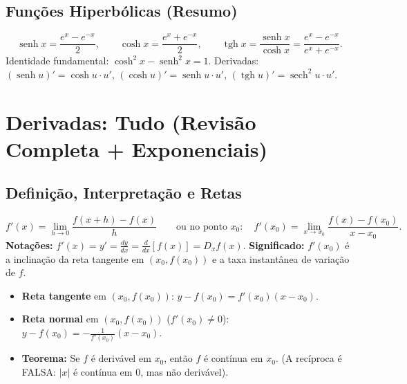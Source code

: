 \documentclass[10pt,a4paper]{article}
\DeclareMathOperator{\senh}{senh}
\DeclareMathOperator{\tgh}{tgh}
\begin{document}
\subsection{Funções Hiperbólicas (Resumo)}
\[
    \senh x = \frac{e^x - e^{-x}}{2}, \qquad
    \cosh x = \frac{e^x + e^{-x}}{2}, \qquad
    \tgh x = \frac{\senh x}{\cosh x} = \frac{e^x - e^{-x}}{e^x + e^{-x}}.
\]
Identidade fundamental: $\cosh^2 x - \senh^2 x = 1$. \quad
Derivadas: $(\senh u)' = \cosh u \cdot u'$, \quad $(\cosh u)' = \senh u \cdot u'$, \quad $(\tgh u)' = \operatorname{sech}^2 u \cdot u'$.

\section{Derivadas: Tudo (Revisão Completa + Exponenciais)}

\subsection{Definição, Interpretação e Retas}
\begin{defi}
    \[
        f'(x) = \lim_{h \to 0} \frac{f(x+h) - f(x)}{h} \qquad \text{ou no ponto } x_0: \quad f'(x_0) = \lim_{x \to x_0} \frac{f(x) - f(x_0)}{x - x_0}.
    \]
    \textbf{Notações:} $f'(x) = y' = \frac{dy}{dx} = \frac{d}{dx}[f(x)] = D_x f(x)$. \quad
    \textbf{Significado:} $f'(x_0)$ é a inclinação da reta tangente em $(x_0, f(x_0))$ e a taxa instantânea de variação de $f$.
    \begin{itemize}
        \item \textbf{Reta tangente} em $(x_0, f(x_0))$: $\displaystyle y - f(x_0) = f'(x_0)(x - x_0)$.
        \item \textbf{Reta normal} em $(x_0, f(x_0))$ ($f'(x_0) \neq 0$): $\displaystyle y - f(x_0) = -\frac{1}{f'(x_0)}(x - x_0)$.
        \item \textbf{Teorema:} Se $f$ é derivável em $x_0$, então $f$ é contínua em $x_0$. (A recíproca é FALSA: $|x|$ é contínua em $0$, mas não derivável).
    \end{itemize}
\end{defi}
\end{document}

